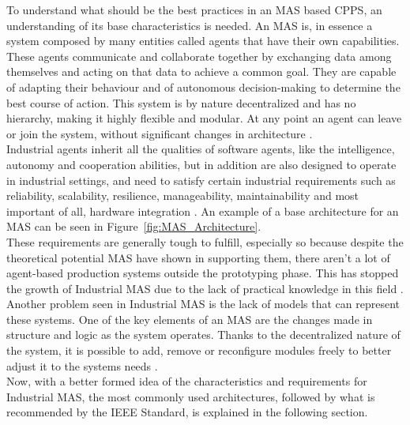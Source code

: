 
To understand what should be the best practices in an \acrshort{MAS} based \acrshort{CPPS}, an understanding of its base characteristics is needed. An \acrshort{MAS} is, in essence a system composed by many entities called agents that have their own capabilities. These agents communicate and collaborate together by exchanging data among themselves and acting on that data to achieve a common goal. They are capable of adapting their behaviour and of autonomous decision-making to determine the best course of action. This system is by nature decentralized and has no hierarchy, making it highly flexible and modular. At any point an agent can leave or join the system, without significant changes in architecture \cite{paulo02}.\\

Industrial agents inherit all the qualities of software agents, like the intelligence, autonomy and cooperation abilities, but in addition are also designed to operate in industrial settings, and need to satisfy certain industrial requirements such as reliability, scalability, resilience, manageability, maintainability and most important of all, hardware integration \cite{Leitao2021}. An example of a base architecture for an \acrshort{MAS} can be seen in Figure~\ref{fig:MAS_Architecture}. \\



These requirements are generally tough to fulfill, especially so because despite the theoretical potential \acrshort{MAS} have shown in supporting them, there aren't a lot of agent-based production systems outside the prototyping phase. This has stopped the growth of Industrial \acrshort{MAS} due to the lack of practical knowledge in this field \cite{Karnouskos2019}. Another problem seen in Industrial \acrshort{MAS} is the lack of models that can represent these systems. One of the key elements of an \acrshort{MAS} are the changes made in structure and logic as the system operates. Thanks to the decentralized nature of the system, it is possible to add, remove or reconfigure modules freely to better adjust it to the systems needs \cite{Karnouskos2019}.\\

Now, with a better formed idea of the characteristics and requirements for Industrial \acrshort{MAS}, the most commonly used architectures, followed by what is recommended by the IEEE Standard, is explained in the following section.

